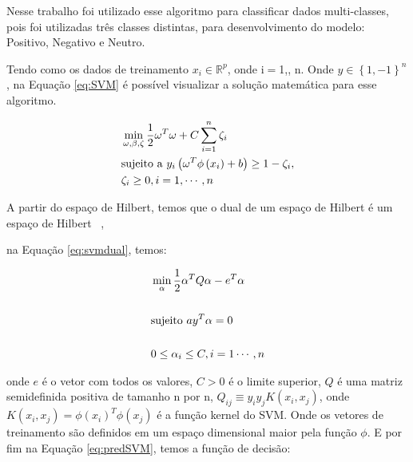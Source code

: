 
        Nesse trabalho foi utilizado esse algoritmo para classificar dados multi-classes, pois foi utilizadas três classes distintas, para
        desenvolvimento do modelo: Positivo, Negativo e Neutro. 
        
        Tendo como os dados de treinamento $x_{i} \in \mathbb{R}^{p}$, onde i$=$1,\cdots, n. Onde $ y \in \left \{ 1,-1 \right \}^{n}$, na Equação \ref{eq:SVM} é
        possível visualizar a solução matemática para esse algoritmo.

        \begin{equation}\label{eq:SVM}
          \begin{aligned}
            & \min_{\omega,\beta, \zeta } \frac{1}{2}\omega^{T}\omega + C \sum_{i=1}^{n}\zeta_{i}\\
            & \textup{sujeito a } y_{i}\left ( \omega^{T}\phi \left ( x_{i} \right ) +b \right )\geq 1 - \zeta_{i},\\
            & \zeta_{i}\geq 0, i = 1,\cdots, n
        \end{aligned}
        \end{equation}

        A partir do espaço de Hilbert, temos que o dual de um espaço de Hilbert é um espaço de Hilbert ~\cite{lorena2007introduccao}, 
        
        na Equação \ref{eq:svmdual}, temos:

        \begin{equation}\label{eq:svmdual}
          \begin{aligned}
            & \min_{\alpha} \frac{1}{2}\alpha^{T}Q\alpha - e^{T}\alpha\\ \\
            & \textup{sujeito } a y^{T}\alpha = 0 \\ \\
            & 0\leq \alpha_{i}\leq C, i= 1\cdots, n 
        \end{aligned}
        \end{equation}

        onde $e$ é o vetor com todos os valores, $C>0$ é o limite superior, $Q$ é uma matriz semidefinida positiva de tamanho n por n,
        $Q_{ij}\equiv y_{i}y_{j}K(x_{i},x_{j})$, onde $K(x_{i},x_{j}) = \phi(x_{i})^{T}\phi(x_{j})$ é a função kernel do \acrshort{SVM}. Onde os 
        vetores de treinamento são definidos em um espaço dimensional maior pela função $\phi$.
         E por fim na Equação \ref{eq:predSVM}, temos a função de decisão:

